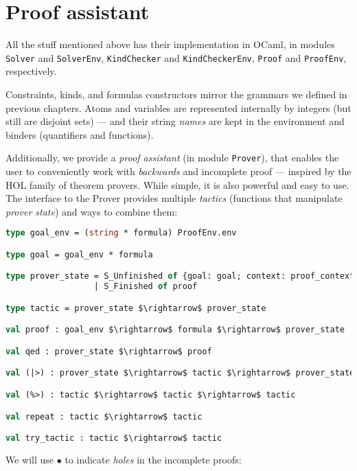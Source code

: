 \documentclass[english, mgr]{iithesis}
\begin{document}
\chapter{Proof assistant}
All the stuff mentioned above has their implementation in OCaml,
in modules \texttt{Solver} and \texttt{SolverEnv},
\texttt{KindChecker} and \texttt{KindCheckerEnv},
\texttt{Proof} and \texttt{ProofEnv}, respectively.

Constraints, kinds, and formulas constructors mirror the grammars we defined
in previous chapters.
Atoms and variables are represented internally by integers (but still are disjoint sets)
--- and their string \textit{names} are kept in the environment and binders
(quantifiers and functions).

Additionally, we provide a \textit{proof assistant} (in module \texttt{Prover}),
that enables the user to conveniently work with \textit{backwards} and incomplete
proof --- inspired by the HOL family of theorem provers.
While simple, it is also powerful and easy to use.
The interface to the Prover provides multiple \textit{tactics}
(functions that manipulate \textit{prover state}) and ways to combine them:
\begin{lstlisting}[mathescape, language=OCaml]
type goal_env = (string * formula) ProofEnv.env

type goal = goal_env * formula

type prover_state = S_Unfinished of {goal: goal; context: proof_context}
                  | S_Finished of proof

type tactic = prover_state $\rightarrow$ prover_state

val proof : goal_env $\rightarrow$ formula $\rightarrow$ prover_state

val qed : prover_state $\rightarrow$ proof

val (|>) : prover_state $\rightarrow$ tactic $\rightarrow$ prover_state

val (%>) : tactic $\rightarrow$ tactic $\rightarrow$ tactic

val repeat : tactic $\rightarrow$ tactic

val try_tactic : tactic $\rightarrow$ tactic
\end{lstlisting}
\newcommand{\hole}{\ensuremath{\bullet}}
We will use $\hole$ to indicate \textit{holes} in the incomplete proofs:
\end{document}
